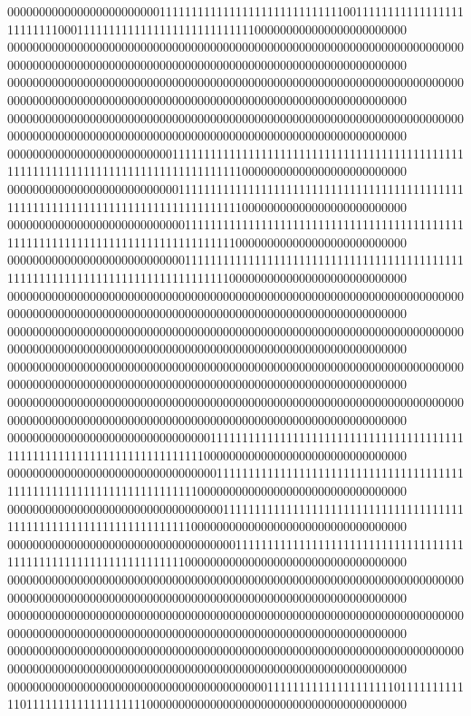 000000000000000000000000111111111111111111111111111110011111111111111111111111110001111111111111111111111111111000000000000000000000000
000000000000000000000000000000000000000000000000000000000000000000000000000000000000000000000000000000000000000000000000000000000000000
000000000000000000000000000000000000000000000000000000000000000000000000000000000000000000000000000000000000000000000000000000000000000
000000000000000000000000000000000000000000000000000000000000000000000000000000000000000000000000000000000000000000000000000000000000000
000000000000000000000000001111111111111111111111111111111111111111111111111111111111111111111111111111111111100000000000000000000000000
000000000000000000000000000111111111111111111111111111111111111111111111111111111111111111111111111111111111100000000000000000000000000
000000000000000000000000000011111111111111111111111111111111111111111111111111111111111111111111111111111111000000000000000000000000000
000000000000000000000000000011111111111111111111111111111111111111111111111111111111111111111111111111111110000000000000000000000000000
000000000000000000000000000000000000000000000000000000000000000000000000000000000000000000000000000000000000000000000000000000000000000
000000000000000000000000000000000000000000000000000000000000000000000000000000000000000000000000000000000000000000000000000000000000000
000000000000000000000000000000000000000000000000000000000000000000000000000000000000000000000000000000000000000000000000000000000000000
000000000000000000000000000000000000000000000000000000000000000000000000000000000000000000000000000000000000000000000000000000000000000
000000000000000000000000000000001111111111111111111111111111111111111111111111111111111111111111111111100000000000000000000000000000000
000000000000000000000000000000000111111111111111111111111111111111111111111111111111111111111111111111000000000000000000000000000000000
000000000000000000000000000000000011111111111111111111111111111111111111111111111111111111111111111110000000000000000000000000000000000
000000000000000000000000000000000000111111111111111111111111111111111111111111111111111111111111111100000000000000000000000000000000000
000000000000000000000000000000000000000000000000000000000000000000000000000000000000000000000000000000000000000000000000000000000000000
000000000000000000000000000000000000000000000000000000000000000000000000000000000000000000000000000000000000000000000000000000000000000
000000000000000000000000000000000000000000000000000000000000000000000000000000000000000000000000000000000000000000000000000000000000000
000000000000000000000000000000000000000001111111111111111111101111111111110111111111111111111100000000000000000000000000000000000000000

